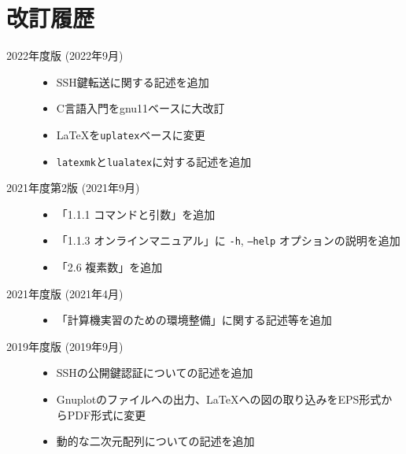 \section*{改訂履歴}

\noindent
\begin{description}
    \item [2022年度版 (2022年9月)] \mbox{}

          \begin{itemize}
              \item SSH鍵転送に関する記述を追加
              \item C言語入門をgnu11ベースに大改訂
              \item \LaTeX を\texttt{uplatex}ベースに変更
              \item \texttt{latexmk}と\texttt{lualatex}に対する記述を追加
          \end{itemize}

    \item[2021年度第2版 (2021年9月)] \mbox{}

          \begin{itemize}
              \item 「1.1.1 コマンドと引数」を追加
              \item 「1.1.3 オンラインマニュアル」に \texttt{-h}, \texttt{--help} オプションの説明を追加
              \item 「2.6 複素数」を追加
          \end{itemize}

    \item[2021年度版 (2021年4月)] \mbox{}

          \begin{itemize}
              \item 「計算機実習のための環境整備」に関する記述等を追加
          \end{itemize}

    \item[2019年度版 (2019年9月)] \mbox{}

          \begin{itemize}
              \item SSHの公開鍵認証についての記述を追加
              \item Gnuplotのファイルへの出力、\LaTeX への図の取り込みをEPS形式からPDF形式に変更
              \item 動的な二次元配列についての記述を追加
          \end{itemize}


\end{description}
